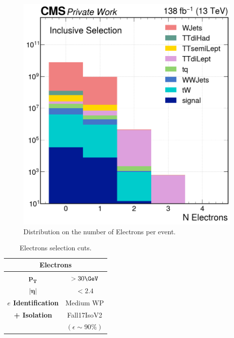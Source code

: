 \begin{minipage}{\linewidth}
    \begin{minipage}{0.53\linewidth}
        \begin{figure}[H]
            \centering
            \includegraphics[width=1\linewidth]{fig//chap07-selection/nElectrons.png}
            \caption{Distribution on the number of Electrons per event.}
            \label{fig:n_ele}
        \end{figure}
    \end{minipage}
    \hfill
    \begin{minipage}{0.46\linewidth}
        \vspace{-1.5cm}
        \begin{table}[H]
            \centering
            \renewcommand{\arraystretch}{1.48}
            \begin{tabular}{c|c}
                \toprule
                \multicolumn{2}{c}{\textbf{Electrons}}\\
                \midrule
                \midrule
                $\mathbf{p_T}$& $>30 \GeV$\\
                \midrule
                $\bm{|\eta|}$& $<2.4$ \\
                \midrule
                \textbf{$e$ Identification}&Medium WP\\
                \textbf{+ Isolation}&Fall17IsoV2 \\
                &$(\epsilon \sim 90\%)$\\
                \bottomrule
            \end{tabular}
            \caption{Electrons selection cuts.}
        \end{table}      
    \end{minipage}
\end{minipage}


